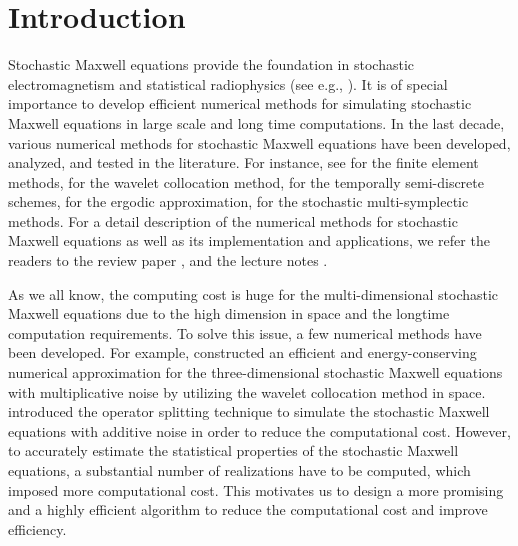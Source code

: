 \documentclass[preprint,12pt]{article}
\numberwithin{figure}{section}
\numberwithin{table}{section}
\numberwithin{equation}{section}
\begin{document}
\section{Introduction}
\label{Introduction}
Stochastic Maxwell equations provide the foundation in stochastic electromagnetism and statistical radiophysics (see e.g., \cite{RefRKT1989}). It is of special importance to develop efficient numerical methods for simulating stochastic Maxwell equations in large scale and long time computations. In the last decade, various numerical methods for stochastic Maxwell equations have been developed, analyzed, and tested in the literature. For instance, see \cite{RefKai,RefChen2021,RefSSX2023} for the finite element methods, \cite{RefHJZC2017} for the wavelet collocation method, \cite{RefCHJ2019a,RefCHJ2019b,RefCCHS2020} for the temporally semi-discrete schemes, \cite{RefCHJL2025} for the ergodic approximation, \cite{Refhai,RefSSX2022,RefCHZ2016} for the stochastic multi-symplectic methods. For a detail description of the numerical methods for stochastic Maxwell equations as well as its implementation and applications, we refer the readers to the review paper \cite{RefZCHJ2019}, and the lecture notes \cite{RefCHJ2023}.

As we all know, the computing cost is huge for the multi-dimensional stochastic Maxwell equations due to the high dimension in space and the longtime computation requirements. To solve this issue, a few numerical methods have been developed. For example, \cite{RefHJZC2017} constructed an efficient and energy-conserving numerical approximation for the three-dimensional stochastic Maxwell equations with multiplicative noise by utilizing the wavelet collocation method in space. \cite{RefCHJ2023} introduced the operator splitting technique to simulate the stochastic Maxwell equations with additive noise in order to reduce the computational cost. However, to accurately estimate the statistical properties of the stochastic Maxwell equations, a substantial number of realizations have to be computed, which imposed more computational cost. This motivates us to design a more promising and a highly efficient algorithm to reduce the computational cost and improve efficiency.
\end{document}
